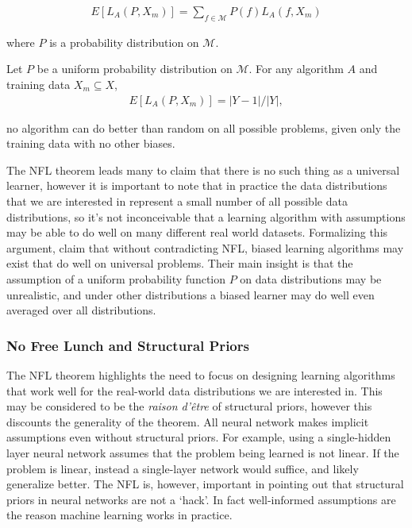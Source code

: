 \documentclass[thesis]{subfiles}
\begin{document}
\begin{align}
    E\left[ L_A\left(P, X_m\right) \right] = \sum_{f\in \mathcal{M}} P(f)L_A(f, X_m)
\end{align} 

where $P$ is a probability distribution on $\mathcal{M}$.

\begin{theorem}\label{NFL}
Let $P$ be a uniform probability distribution on $\mathcal{M}$. For any algorithm $A$ and training data $X_m\subseteq X$,
\begin{align}
    E\left[ L_A\left(P, X_m\right) \right] = | Y - 1 |/|Y|,
\end{align}
\end{theorem}

\ie no algorithm can do better than random on all possible problems, given only the training data with no other biases.

The NFL theorem leads many to claim that there is no such thing as a universal learner, however it is important to note that in practice the data distributions that we are interested in represent a small number of all possible data distributions, so it's not inconceivable that a learning algorithm with assumptions may be able to do well on many different real world datasets. Formalizing this argument, \citet{lattimore2013no} claim that without contradicting NFL, biased learning algorithms may exist that do well on universal problems. Their main insight is that the assumption of a uniform probability function $P$ on data distributions may be unrealistic, and under other distributions a biased learner may do well even averaged over all distributions.

\subsubsection{No Free Lunch and Structural Priors}
The NFL theorem highlights the need to focus on designing learning algorithms that work well for the real-world data distributions we are interested in. This may be considered to be the \emph{raison d'\^{e}tre} of structural priors, however this discounts the generality of the theorem. All neural network makes implicit assumptions even without structural priors. For example, using a single-hidden  layer neural network assumes that the problem being learned is not linear. If the problem is linear, instead a single-layer network would suffice, and likely generalize better. The NFL is, however, important in pointing out that structural priors in neural networks are not a `hack'. In fact well-informed assumptions are the reason machine learning works in practice.
\end{document}
